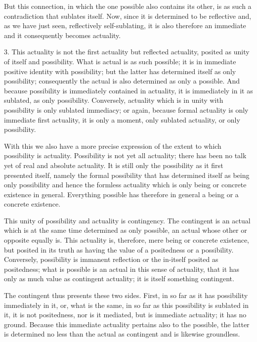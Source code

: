 But this connection, in which the one possible also contains its other,
is as such a contradiction that sublates itself.
Now, since it is determined to be reflective
and, as we have just seen, reflectively self-sublating,
it is also therefore an immediate
and it consequently becomes actuality.

3. This actuality is not the first actuality but reflected actuality,
posited as unity of itself and possibility.
What is actual is as such possible;
it is in immediate positive identity with possibility;
but the latter has determined itself as only possibility;
consequently the actual is also determined as only a possible.
And because possibility is immediately contained in actuality,
it is immediately in it as sublated, as only possibility.
Conversely, actuality which is in unity with possibility
is only sublated immediacy;
or again, because formal actuality is only immediate first actuality,
it is only a moment, only sublated actuality, or only possibility.

With this we also have a more precise expression of
the extent to which possibility is actuality.
Possibility is not yet all actuality;
there has been no talk yet of real and absolute actuality.
It is still only the possibility as it first presented itself,
namely the formal possibility that has determined itself
as being only possibility and hence the formless actuality
which is only being or concrete existence in general.
Everything possible has therefore in general
a being or a concrete existence.

This unity of possibility and actuality is contingency.
The contingent is an actual which is at the same time
determined as only possible, an actual whose other or opposite equally is.
This actuality is, therefore, mere being or concrete existence,
but posited in its truth as having the value
of a positedness or a possibility.
Conversely, possibility is immanent reflection
or the in-itself posited as positedness;
what is possible is an actual in this sense of actuality,
that it has only as much value as contingent actuality;
it is itself something contingent.

The contingent thus presents these two sides.
First, in so far as it has possibility immediately in it,
or, what is the same, in so far as
this possibility is sublated in it,
it is not positedness, nor is it mediated,
but is immediate actuality; it has no ground.
Because this immediate actuality pertains also to the possible,
the latter is determined no less than the actual as contingent
and is likewise groundless.


